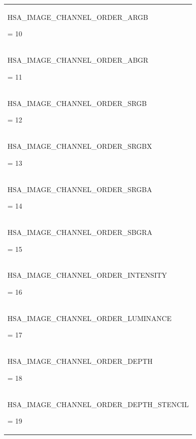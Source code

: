 \documentclass[final]{book}
\newcommand{\reftyp}[1]{#1}
\newcommand{\refenu}[1]{\reftyp{#1}}
\begin{document}
\begin{appendices}
\begin{longtable}{@{\hspace{2em}}p{\linewidth-2em}}
\hspace{-2em}\hypertarget{group--images-1gga75748fdd35b33c62366157f3d072d65ba0befdda340439b3638c6aeed94190ee2}{\refenu{HSA_IMAGE_CHANNEL_ORDER_ARGB}} = 10\\[2mm]
\hspace{-2em}\hypertarget{group--images-1gga75748fdd35b33c62366157f3d072d65ba10e24d629f60b722f628d4648a4cf128}{\refenu{HSA_IMAGE_CHANNEL_ORDER_ABGR}} = 11\\[2mm]
\hspace{-2em}\hypertarget{group--images-1gga75748fdd35b33c62366157f3d072d65ba6e2f614e71651a6340ef03b23a46e838}{\refenu{HSA_IMAGE_CHANNEL_ORDER_SRGB}} = 12\\[2mm]
\hspace{-2em}\hypertarget{group--images-1gga75748fdd35b33c62366157f3d072d65baa56f2d7fce5704304ecb52b6144357f6}{\refenu{HSA_IMAGE_CHANNEL_ORDER_SRGBX}} = 13\\[2mm]
\hspace{-2em}\hypertarget{group--images-1gga75748fdd35b33c62366157f3d072d65baa15f44c362ce990761ee476934866195}{\refenu{HSA_IMAGE_CHANNEL_ORDER_SRGBA}} = 14\\[2mm]
\hspace{-2em}\hypertarget{group--images-1gga75748fdd35b33c62366157f3d072d65baea0abf2e54926781d49d9b15a20f57aa}{\refenu{HSA_IMAGE_CHANNEL_ORDER_SBGRA}} = 15\\[2mm]
\hspace{-2em}\hypertarget{group--images-1gga75748fdd35b33c62366157f3d072d65ba13ebcc3a3e42e67250ac794001863475}{\refenu{HSA_IMAGE_CHANNEL_ORDER_INTENSITY}} = 16\\[2mm]
\hspace{-2em}\hypertarget{group--images-1gga75748fdd35b33c62366157f3d072d65ba92ec161348b7b13a74e8f18ced9a87e6}{\refenu{HSA_IMAGE_CHANNEL_ORDER_LUMINANCE}} = 17\\[2mm]
\hspace{-2em}\hypertarget{group--images-1gga75748fdd35b33c62366157f3d072d65ba68a29ada0e200d4feca8a75b6a5c9958}{\refenu{HSA_IMAGE_CHANNEL_ORDER_DEPTH}} = 18\\[2mm]
\hspace{-2em}\hypertarget{group--images-1gga75748fdd35b33c62366157f3d072d65ba378be138358566d67b5891a7ea1fdef4}{\refenu{HSA_IMAGE_CHANNEL_ORDER_DEPTH_STENCIL}} = 19
\end{longtable}


\end{appendices}
\end{document}
